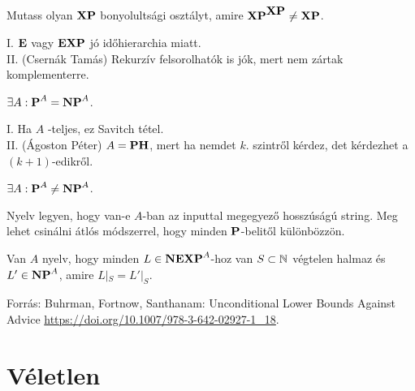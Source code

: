 \begin{Exercise}[counter={sorszam}, difficulty=0]
	Mutass olyan $\XP$ bonyolults\'agi oszt\'alyt, amire $\XP^{\XP}\ne \XP$.
\end{Exercise}	
\begin{Answer}
	I. $\E$ vagy $\EXP$ j\'o id\H ohierarchia miatt.\\
	II. (Csern\'ak Tam\'as) Rekurz\'iv felsorolhat\'ok is j\'ok, mert nem z\'artak komplementerre.
\end{Answer}


\begin{Exercise}[counter={sorszam}, difficulty=0]
	$\exists A: \P^A= \NP^A$.
\end{Exercise}	
\begin{Answer}
	I. Ha $A$ \PSPACE-teljes, ez Savitch t\'etel.\\
	II. (\'Agoston P\'eter) $A=\PH$, mert ha nemdet $k$. szintr\H ol k\'erdez, det k\'erdezhet a $(k+1)$-edikr\H ol.
\end{Answer}


\begin{Exercise}[counter={sorszam}, difficulty=1]
	$\exists A: \P^A\ne \NP^A$.
\end{Exercise}	
\begin{Answer}
	Nyelv legyen, hogy van-e $A$-ban az inputtal megegyez\H o hossz\'us\'ag\'u string.
	Meg lehet csin\'alni \'atl\'os m\'odszerrel, hogy minden $\P$-belit\H ol k\"ul\"onb\"ozz\"on.
\end{Answer}


\begin{Exercise}[counter={sorszam}, difficulty=1]
	Van $A$ nyelv, hogy minden $L\in \NEXP^A$-hoz van $S\subset \N$ v\'egtelen halmaz \'es $L'\in\NP^A$, amire $L|_S=L'|_S$.
\end{Exercise}	
\begin{Answer}
	Forr\'as: Buhrman, Fortnow, Santhanam: Unconditional Lower Bounds Against Advice \url{https://doi.org/10.1007/978-3-642-02927-1_18}.
\end{Answer}






\chapter{V\'eletlen}

